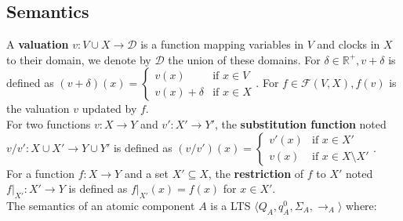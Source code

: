 \documentclass[a4paper]{article}
\begin{document}
\subsection*{Semantics}
A \textbf{valuation} $v: V \cup X \to \mathcal{D}$ is a function mapping variables in $V$ and clocks in $X$ to their
domain, we denote by $\mathcal{D}$ the union of these domains.
For $\delta \in \mathbb{R}^+, v+\delta$ is defined as $(v+\delta) (x) =
  \begin{cases}
    v(x)          & \text{if $x \in V$} \\
    v(x) + \delta & \text{if $x \in X$}
  \end{cases}.$
For $f \in \mathcal{F}(V, X), f(v)$ is the valuation $v$ updated by $f$. \\
For two functions $v: X \to Y$ and $v': X' \to Y'$, the \textbf{substitution function} noted
$v/v': X \cup X' \to Y \cup Y'$ is defined as $(v/v') (x) =
  \begin{cases}
    v'(x) & \text{if } x \in X'             \\
    v(x)  & \text{if } x \in X \setminus X'
  \end{cases}$. \\
For a function $f: X \to Y$ and a set $X' \subseteq X$, the \textbf{restriction} of $f$ to $X'$ noted
$f \vert_{X'}: X' \to Y$ is defined as $f \vert_{X'}(x) = f(x)$ for $x \in X'$.\\
The semantics of an atomic component $A$ is a LTS $\langle Q_A, q_A^0, \Sigma_A, \xrightarrow{}_A \rangle$ where:
\end{document}
